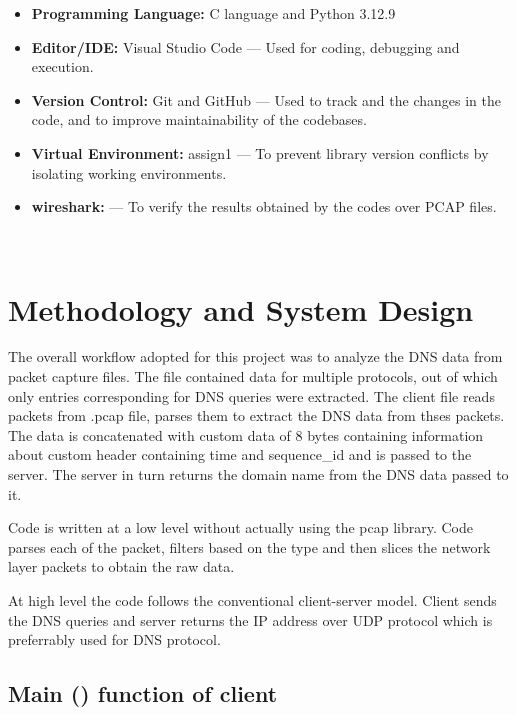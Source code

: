 \documentclass[12pt, a4paper]{report}
\begin{document}
\begin{itemize}
    \item \textbf{Programming Language:} C language and Python 3.12.9
    \item \textbf{Editor/IDE:} Visual Studio Code --- Used for coding, debugging and execution.
    \item \textbf{Version Control:} Git and GitHub --- Used to track and the changes in the code, and to improve maintainability of the codebases.
    \item \textbf{Virtual Environment:} assign1 --- To prevent library version conflicts by isolating working environments.
    \item \textbf{wireshark:} --- To verify the results obtained by the codes over PCAP files.
\end{itemize}

\
\section{Methodology and System Design}


The overall workflow adopted for this project was to analyze the DNS data from packet capture files. The file contained data for multiple protocols, out of which only entries corresponding for DNS queries were extracted.
The client file reads packets from .pcap file, parses them to extract the DNS data from thses packets. The data is concatenated with custom data of 8 bytes containing information about custom header containing time and sequence\_id and is passed to the server. The server in turn returns the domain name from the DNS data passed to it.

Code is written at a low level without actually using the pcap library. Code parses each of the packet, filters based on the type and then slices the network layer packets to obtain the raw data.

At high level the code follows the conventional client-server model. Client sends the DNS queries and server returns the IP address over UDP protocol which is preferrably used for DNS protocol.


\newpage
\subsection{Main () function of client}
\end{document}
